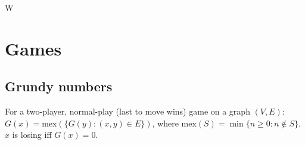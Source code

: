 \documentclass[12pt]{extarticle}
\begin{document}
\begin{multicols*}{2}


W

\section{Games}

\subsection{Grundy numbers}
For a two-player, normal-play (last to move wins) game on a graph $(V,E)$:
$G(x) = \mbox{mex}(\{ G(y) : (x, y) \in E \})$,
where $\mbox{mex}(S) = \min \{ n \ge 0: n \not\in S \}$.
$x$ is losing iff $G(x) = 0$.




\end{multicols*}
\end{document}
